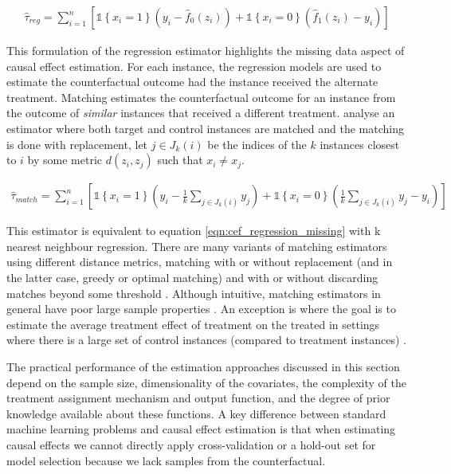 \documentclass[11pt,a4paper,twoside]{report}
\newcommand{\set}[1]{\left\{#1\right\}}
\newcommand{\ind}[1]{\mathds{1}\!\!\set{#1}}
\newcommand{\eqn}[1]{\begin{align}#1\end{align}}
\theoremstyle{plain}
\theoremstyle{definition}
\begin{document}
\eqn{
\label{eqn:cef_regression_missing}
\hat{\tau}_{reg} = \sum_{i=1}^n \left[\ind{x_i=1}\left(y_i - \hat{f}_0(z_i)\right) +\ind{x_i=0}\left(\hat{f}_1(z_i) - y_i \right)\right]
}

This formulation of the regression estimator highlights the missing data aspect of causal effect estimation. For each instance, the regression models are used to estimate the counterfactual outcome had the instance received the alternate treatment. Matching estimates the counterfactual outcome for an instance from the outcome of \emph{similar} instances that received a different treatment. \citet{Abadie2002} analyse an estimator where both target and control instances are matched and the matching is done with replacement, let $j \in J_k(i)$ be the indices of the $k$ instances closest to $i$ by some metric $d(z_i,z_j)$ such that $x_i \neq x_j$.

\eqn{
\hat{\tau}_{match} = \sum_{i=1}^n \left[\ind{x_i=1}\left(y_i - \frac{1}{k}\sum_{j \in J_k(i)}y_j\right) +\ind{x_i=0}\left(\frac{1}{k}\sum_{j \in J_k(i)}y_j - y_i \right)\right]
}

This estimator is equivalent to equation \ref{eqn:cef_regression_missing} with k nearest neighbour regression. There are many variants of matching estimators using different distance metrics, matching with or without replacement (and in the latter case, greedy or optimal matching) and with or without discarding matches beyond some threshold \citep{Cochran1973,rosenbaum1985constructing}. Although intuitive, matching estimators in general have poor large sample properties \citep{Abadie2006}. An exception is where the goal is to estimate the average treatment effect of treatment on the treated in settings where there is a large set of control instances (compared to treatment instances) \citep{Imbens2004}. 

The practical performance of the estimation approaches discussed in this section depend on the sample size, dimensionality of the covariates, the complexity of the treatment assignment mechanism and output function, and the degree of prior knowledge available about these functions. A key difference between standard machine learning problems and causal effect estimation is that when estimating causal effects we cannot directly apply cross-validation or a hold-out set for model selection because we lack samples from the counterfactual. 
\end{document}
